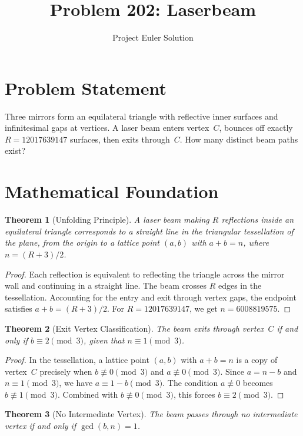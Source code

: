 \documentclass[12pt]{article}
\title{Problem 202: Laserbeam}
\author{Project Euler Solution}
\date{}
\newtheorem{theorem}{Theorem}
\begin{document}
\maketitle

\section{Problem Statement}
Three mirrors form an equilateral triangle with reflective inner surfaces and infinitesimal
gaps at vertices. A laser beam enters vertex~$C$, bounces off exactly $R = 12017639147$
surfaces, then exits through~$C$. How many distinct beam paths exist?

\section{Mathematical Foundation}

\begin{theorem}[Unfolding Principle]
A laser beam making $R$ reflections inside an equilateral triangle corresponds to a
straight line in the triangular tessellation of the plane, from the origin to a lattice
point $(a,b)$ with $a + b = n$, where $n = (R+3)/2$.
\end{theorem}

\begin{proof}
Each reflection is equivalent to reflecting the triangle across the mirror wall and
continuing in a straight line. The beam crosses $R$ edges in the tessellation. Accounting
for the entry and exit through vertex gaps, the endpoint satisfies
$a + b = (R+3)/2$. For $R = 12017639147$, we get $n = 6008819575$.
\end{proof}

\begin{theorem}[Exit Vertex Classification]
The beam exits through vertex~$C$ if and only if $b \equiv 2 \pmod{3}$, given that
$n \equiv 1 \pmod{3}$.
\end{theorem}

\begin{proof}
In the tessellation, a lattice point $(a,b)$ with $a+b = n$ is a copy of vertex~$C$ precisely when
$b \not\equiv 0 \pmod{3}$ and $a \not\equiv 0 \pmod{3}$. Since $a = n - b$ and
$n \equiv 1 \pmod{3}$, we have $a \equiv 1 - b \pmod{3}$. The condition
$a \not\equiv 0$ becomes $b \not\equiv 1 \pmod{3}$. Combined with $b \not\equiv 0 \pmod{3}$,
this forces $b \equiv 2 \pmod{3}$.
\end{proof}

\begin{theorem}[No Intermediate Vertex]
The beam passes through no intermediate vertex if and only if $\gcd(b, n) = 1$.
\end{theorem}
\end{document}
